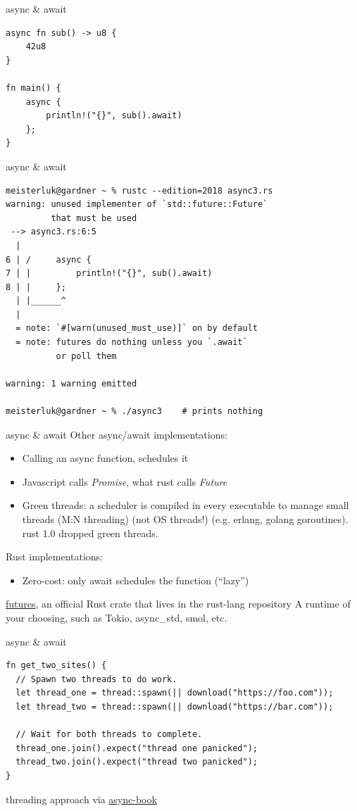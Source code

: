 \documentclass{beamer}
\begin{document}
\begin{frame}[fragile]{async \& await}
  \begin{verbatim}
async fn sub() -> u8 {
    42u8
}

fn main() {
    async {
        println!("{}", sub().await)
    };
}
  \end{verbatim}
\end{frame}

\begin{frame}[fragile]{async \& await}
  \begin{verbatim}
meisterluk@gardner ~ % rustc --edition=2018 async3.rs
warning: unused implementer of `std::future::Future`
         that must be used
 --> async3.rs:6:5
  |
6 | /     async {
7 | |         println!("{}", sub().await)
8 | |     };
  | |______^
  |
  = note: `#[warn(unused_must_use)]` on by default
  = note: futures do nothing unless you `.await`
          or poll them

warning: 1 warning emitted

meisterluk@gardner ~ % ./async3    # prints nothing
  \end{verbatim}
\end{frame}

\begin{frame}[fragile]{async \& await}
  Other async/await implementations:
  \begin{itemize}
    \item Calling an async function, schedules it
    \item Javascript calls \emph{Promise}, what rust calls \emph{Future}
    \item Green threads: a scheduler is compiled in every executable to manage small threads (M:N threading) (not OS threads!) (e.g. erlang, golang goroutines). rust 1.0 dropped green threads.
  \end{itemize}
  Rust implementations:
  \begin{itemize}
    \item Zero-cost: only await schedules the function (\enquote{lazy})
  \end{itemize}


    \href{https://crates.io/crates/futures}{futures}, an official Rust crate that lives in the rust-lang repository
    A runtime of your choosing, such as Tokio, async_std, smol, etc.

\end{frame}

\begin{frame}[fragile]{async \& await}
  \begin{verbatim}
fn get_two_sites() {
  // Spawn two threads to do work.
  let thread_one = thread::spawn(|| download("https://foo.com"));
  let thread_two = thread::spawn(|| download("https://bar.com"));

  // Wait for both threads to complete.
  thread_one.join().expect("thread one panicked");
  thread_two.join().expect("thread two panicked");
}
  \end{verbatim}
  threading approach via \href{https://rust-lang.github.io/async-book/01_getting_started/02_why_async.html}{async-book}
\end{frame}
\end{document}
